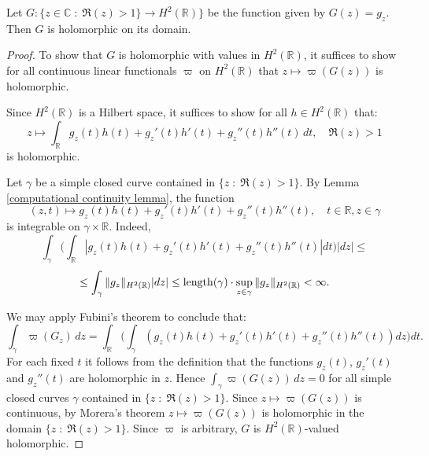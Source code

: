     
    \begin{thm}\label{computational analytic lemma} 
        Let $G:\{z \in \mathbb{C}\;:\; \Re(z) > 1\}\to H^2(\mathbb{R})\}$ be the function given by $G(z) = g_z$. Then $G$ is holomorphic on its domain.
    \end{thm}
    \begin{proof}
        To show that $G$ is holomorphic with values in $H^2(\mathbb{R})$, it suffices to show for all continuous linear functionals $\varpi$ on $H^2(\mathbb{R})$ that $z\mapsto \varpi(G(z))$ is holomorphic.
        
        Since $H^2(\mathbb{R})$ is a Hilbert space, it suffices to show for all $h \in H^2(\mathbb{R})$ that:
        \begin{equation}\label{companal main eq}
            z \mapsto \int_{\mathbb{R}} g_z(t)h(t)+g_z'(t)h'(t)+g_z''(t)h''(t)\,dt,\quad \Re(z) > 1
        \end{equation}
        is holomorphic. 
        
        Let $\gamma$ be a simple closed curve contained in $\{z\;:\;\Re(z) > 1\}$. By Lemma \ref{computational continuity lemma}, the function 
        \begin{equation*}
            (z,t) \mapsto g_z(t)h(t) + g_z'(t)h'(t) + g_z''(t)h''(t),\quad t \in \mathbb{R}, z \in \gamma
        \end{equation*}
        is integrable on $\gamma\times \mathbb{R}.$ Indeed,
        $$\int_{\gamma}\Big(\int_{\mathbb{R}}|g_z(t)h(t) + g_z'(t)h'(t) + g_z''(t)h''(t)|dt\Big)|dz|\leq$$
        $$\leq\int_{\gamma}\|g_z\|_{H^2(\mathbb{R})}|dz|\leq {\rm length}(\gamma)\cdot\sup_{z\in\gamma}\|g_z\|_{H^2(\mathbb{R})}<\infty.$$
        
        We may apply Fubini's theorem to conclude that:
        \begin{equation*}
            \int_{\gamma} \varpi(G_z)\,dz = \int_{\mathbb{R}}\Big(\int_{\gamma}(g_z(t)h(t)+g_z'(t)h'(t)+g_z''(t)h''(t))dz\Big)dt.
        \end{equation*}
        For each fixed $t$ it follows from the definition that the functions $g_z(t)$, $g_z'(t)$ and $g_z''(t)$ are holomorphic in $z$. Hence $\int_{\gamma} \varpi(G(z))\,dz = 0$ for all simple closed curves $\gamma$ contained in $\{z\;:\;\Re(z) > 1\}$. Since $z \mapsto \varpi(G(z))$ is continuous, by Morera's theorem
        $z\mapsto \varpi(G(z))$ is holomorphic in the domain $\{z\;:\;\Re(z) > 1\}$. Since $\varpi$ is arbitrary, $G$ is $H^2(\mathbb{R})$-valued holomorphic.
    \end{proof} 
 
